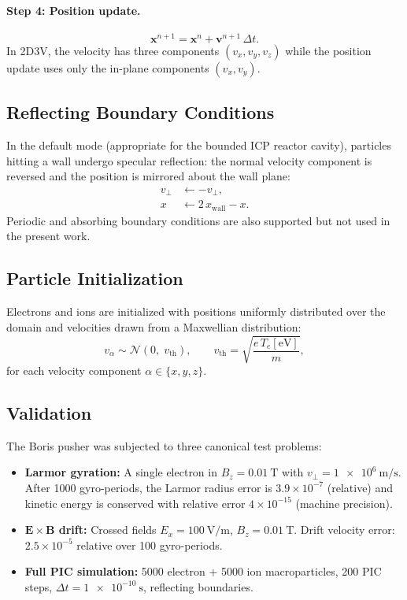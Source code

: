 \documentclass[11pt,a4paper]{report}
\newcommand{\dt}{\Delta t}
\begin{document}
\paragraph{Step 4: Position update.}
\begin{equation}
  \mathbf{x}^{n+1} = \mathbf{x}^n + \mathbf{v}^{n+1}\,\dt.
  \label{eq:boris-xupdate}
\end{equation}
In 2D3V, the velocity has three components $(v_x, v_y, v_z)$ while the position update uses only the in-plane components $(v_x, v_y)$.

\subsection{Reflecting Boundary Conditions}

In the default mode (appropriate for the bounded ICP reactor cavity), particles hitting a wall undergo specular reflection: the normal velocity component is reversed and the position is mirrored about the wall plane:
\begin{align}
  v_\perp &\leftarrow -v_\perp, \\
  x &\leftarrow 2\,x_\mathrm{wall} - x.
\end{align}
Periodic and absorbing boundary conditions are also supported but not used in the present work.

\subsection{Particle Initialization}

Electrons and ions are initialized with positions uniformly distributed over the domain and velocities drawn from a Maxwellian distribution:
\begin{equation}
  v_\alpha \sim \mathcal{N}\!\left(0,\; v_\mathrm{th}\right), \qquad
  v_\mathrm{th} = \sqrt{\frac{e\,T_e[\mathrm{eV}]}{m}},
  \label{eq:pic-maxwellian}
\end{equation}
for each velocity component $\alpha \in \{x, y, z\}$.

\subsection{Validation}

The Boris pusher was subjected to three canonical test problems:
\begin{itemize}
  \item \textbf{Larmor gyration:} A single electron in $B_z = \SI{0.01}{\tesla}$ with $v_\perp = \SI{1e6}{\meter\per\second}$.  After 1000 gyro-periods, the Larmor radius error is $3.9 \times 10^{-7}$ (relative) and kinetic energy is conserved with relative error $4 \times 10^{-15}$ (machine precision).
  \item \textbf{$\mathbf{E} \times \mathbf{B}$ drift:} Crossed fields $E_x = \SI{100}{\volt\per\meter}$, $B_z = \SI{0.01}{\tesla}$.  Drift velocity error: $2.5 \times 10^{-5}$ relative over 100 gyro-periods.
  \item \textbf{Full PIC simulation:} 5000 electron + 5000 ion macroparticles, 200 PIC steps, $\dt = \SI{1e-10}{\second}$, reflecting boundaries.
\end{itemize}
\end{document}
